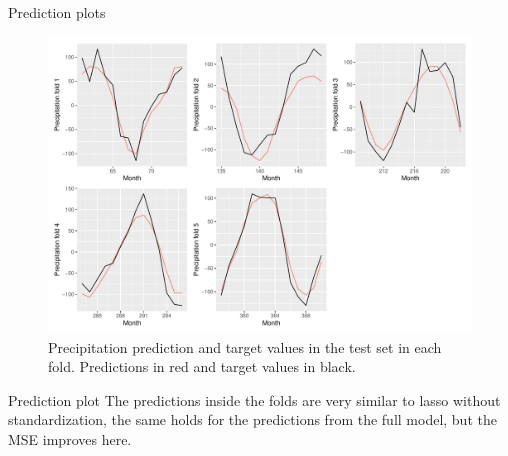 \documentclass[
  ignorenonframetext,
]{beamer}
\begin{document}
\begin{frame}{Prediction plots}
\protect\hypertarget{prediction-plots}{}
\begin{figure}

{\centering \includegraphics[width=0.75\linewidth]{ma-presentation_files/figure-beamer/pred-fold-fused-og-1} 

}

\caption{Precipitation prediction and target values in the test set in each fold. Predictions in red and target values in black.}\label{fig:pred-fold-fused-og}
\end{figure}
\end{frame}

\begin{frame}{Prediction plot}
\protect\hypertarget{prediction-plot}{}
The predictions inside the folds are very similar to lasso without
standardization, the same holds for the predictions from the full model,
but the MSE improves here.
\end{frame}
\end{document}
